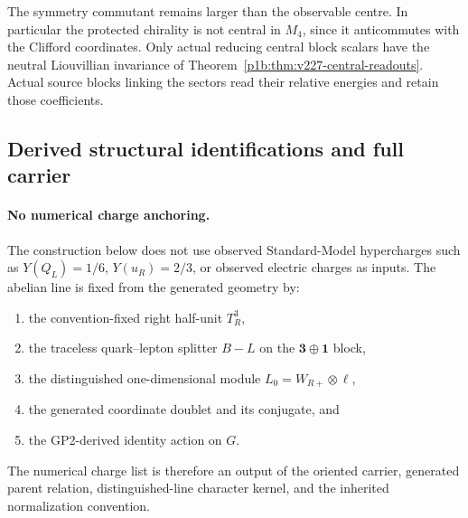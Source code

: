 \documentclass[12pt,a4paper]{article}
\begin{document}
The symmetry commutant remains larger than the observable centre.
In particular the protected chirality is not central in $M_4$, since it
anticommutes with the Clifford coordinates. Only actual reducing central
block scalars have the neutral Liouvillian invariance of
Theorem~\ref{p1b:thm:v227-central-readouts}. Actual source blocks linking
the sectors read their relative energies and retain those coefficients.



\subsection{Derived structural identifications and full carrier}
\label{p5:sec:part1-selected}

\paragraph{No numerical charge anchoring.}
The construction below does not use observed Standard-Model hypercharges such as
\(Y(Q_L)=1/6\), \(Y(u_R)=2/3\), or observed electric charges as inputs.  The
abelian line is fixed from the generated geometry by:
\begin{enumerate}[label=(\roman*), leftmargin=2em]
\item the convention-fixed right half-unit \(T_R^3\),
\item the traceless quark--lepton splitter \(B-L\) on the \(\mathbf 3\oplus\mathbf 1\) block,
\item the distinguished one-dimensional module \(L_0=W_{R+}\otimes\ell\),
\item the generated coordinate doublet and its conjugate, and
\item the GP2-derived identity action on \(G\).
\end{enumerate}
The numerical charge list is therefore an output of the oriented carrier,
generated parent relation, distinguished-line character kernel, and the inherited
normalization convention.
\end{document}
